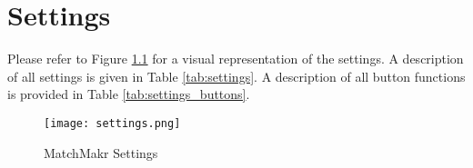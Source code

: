 \chapter{Settings}
\renewcommand{\arraystretch}{1}

Please refer to Figure \ref{fig:settings} for a visual representation of the settings.  A description of all settings is given in Table \ref{tab:settings}.  A description of all button functions is provided in Table \ref{tab:settings_buttons}.


%
%
\begin{figure}[h!]
	\centering
	\texttt{[image: settings.png]}
	\caption{\label{fig:settings} MatchMakr Settings}
\end{figure}

